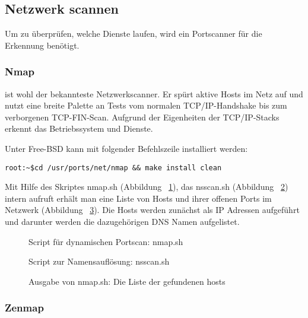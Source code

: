 \subsection{Netzwerk scannen}

Um zu überprüfen, welche Dienste laufen, wird ein Portscanner für die Erkennung
benötigt.

\subsubsection{Nmap}

\Nmap{} ist wohl der bekannteste Netzwerkscanner. Er spürt aktive Hosts im Netz auf
und nutzt eine breite Palette an Tests vom normalen TCP/IP-Handshake bis zum
verborgenen TCP-FIN-Scan. Aufgrund der Eigenheiten der TCP/IP-Stacks erkennt
\Nmap{} das Betriebssystem und Dienste.

Unter Free-BSD kann \Nmap{} mit folgender Befehlszeile installiert werden:

\begin{verbatim}
root:~$cd /usr/ports/net/nmap && make install clean
\end{verbatim}

Mit Hilfe des Skriptes nmap.sh (Abbildung ~\ref{fig:nmap}), das nsscan.sh
(Abbildung ~\ref{fig:nsscan}) intern aufruft erhält man eine Liste von Hosts und
ihrer offenen Ports im Netzwerk (Abbildung ~\ref{fig:hostlist}). Die Hosts
werden zunächst als IP Adressen aufgeführt und darunter werden die dazugehörigen
DNS Namen aufgelistet.

\begin{figure}

\caption{Script für dynamischen Portscan: nmap.sh}
\label{fig:nmap}
\end{figure}

\begin{figure}

\caption{Script zur Namensauflösung: nsscan.sh}
\label{fig:nsscan}
\end{figure}

\begin{figure}

\caption{Ausgabe von nmap.sh: Die Liste der gefundenen hosts}
\label{fig:hostlist}
\end{figure}

\subsubsection{Zenmap}

